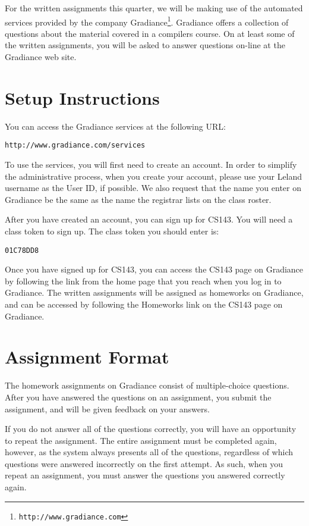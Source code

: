 \documentclass[11pt]{article}
\begin{document}

For the written assignments this quarter, we will be making use of
the automated services provided by the company
Gradiance\footnote{\texttt{http://www.gradiance.com}}.  Gradiance
offers a collection of questions about the material covered in a
compilers course.  On at least some of the written assignments, you
will be asked to answer questions on-line at the Gradiance web site.

\section{Setup Instructions}

You can access the Gradiance services at the following URL:

\begin{verbatim}
http://www.gradiance.com/services
\end{verbatim}

\noindent
To use the services, you will first need to create an account.  In
order to simplify the administrative process, when you create your
account, please use your Leland username as the User ID, if possible.
We also request that the name you enter on Gradiance be the same as
the name the registrar lists on the class roster.

After you have created an account, you can sign up for CS143.  You
will need a class token to sign up.  The class token you should enter
is:

\begin{verbatim}
01C78DD8
\end{verbatim}

Once you have signed up for CS143, you can access the CS143 page on
Gradiance by following the link from the home page that you reach when
you log in to Gradiance.  The written assignments will be assigned as
homeworks on Gradiance, and can be accessed by following the Homeworks
link on the CS143 page on Gradiance.

\section{Assignment Format}

The homework assignments on Gradiance consist of multiple-choice
questions.  After you have answered the questions on an assignment,
you submit the assignment, and will be given feedback on your answers.

If you do not answer all of the questions correctly, you will have an
opportunity to repeat the assignment.  The entire assignment must be
completed again, however, as the system always presents all of the
questions, regardless of which questions were answered incorrectly on
the first attempt.  As such, when you repeat an assignment, you must
answer the questions you answered correctly again.
\end{document}
